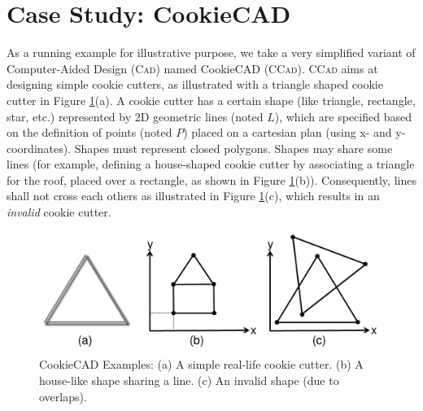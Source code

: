 \section{Case Study: CookieCAD}
\label{sec:CS}

As a running example for illustrative purpose, we take a very simplified variant of 
Computer-Aided Design (\textsc{Cad}) named CookieCAD (\textsc{CCad}). 
\textsc{CCad} aims at designing simple cookie cutters, as illustrated with a triangle shaped cookie cutter in Figure \ref{fig:CookieCAD}(a). A cookie cutter has a certain shape (like 
triangle, rectangle, star, etc.) represented by 2D geometric lines (noted 
$L$), which are specified based on the definition of points (noted $P$) placed 
on a cartesian plan (using x- and y-coordinates). Shapes must represent 
closed polygons. Shapes may share some lines (for example, defining a 
house-shaped cookie cutter by associating a triangle for the roof, placed over a 
rectangle, as shown in Figure \ref{fig:CookieCAD}(b)). Consequently, lines shall not cross each others as illustrated in Figure \ref{fig:CookieCAD}(c), which results in an \emph{invalid} cookie cutter.

\begin{figure}[t]
   \centering
   \includegraphics[width=\columnwidth]{CookieCAD.pdf}
   \caption{CookieCAD Examples: (a) A simple real-life cookie cutter. (b) A 
house-like shape sharing a line. (c) An invalid shape (due to overlaps).}%
   \label{fig:CookieCAD}
\end{figure}


